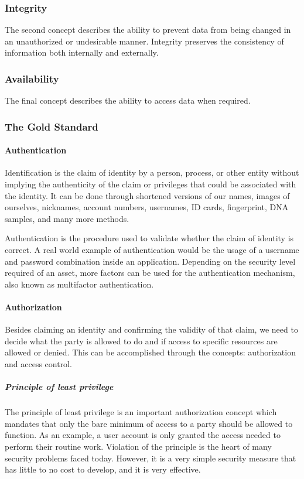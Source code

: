 \subsubsection{Integrity}
The second concept describes the ability to prevent data from being changed in an unauthorized or undesirable manner. Integrity preserves the consistency of information both internally and externally.

\subsubsection{Availability}
The final concept describes the ability to access data when required.

\subsubsection{The Gold Standard}

\paragraph{Authentication}
Identification is the claim of identity by a person, process, or other entity without implying the authenticity of the claim or privileges that could be associated with the identity. It can be done through shortened versions of our names, images of ourselves, nicknames, account numbers, usernames, ID cards, fingerprint, DNA samples, and many more methods.

Authentication is the procedure used to validate whether the claim of identity is correct. A real world example of authentication would be the usage of a username and password combination inside an application. Depending on the security level required of an asset, more factors can be used for the authentication mechanism, also known as multifactor authentication.

\paragraph{Authorization}
Besides claiming an identity and confirming the validity of that claim, we need to decide what the party is allowed to do and if access to specific resources are allowed or denied. This can be accomplished through the concepts: authorization and access control.

\subparagraph{Principle of least privilege}
The principle of least privilege is an important authorization concept which mandates that only the bare minimum of access to a party should be allowed to function. As an example, a user account is only granted the access needed to perform their routine work. Violation of the principle is the heart of many security problems faced today. However, it is a very simple security measure that has little to no cost to develop, and it is very effective.

